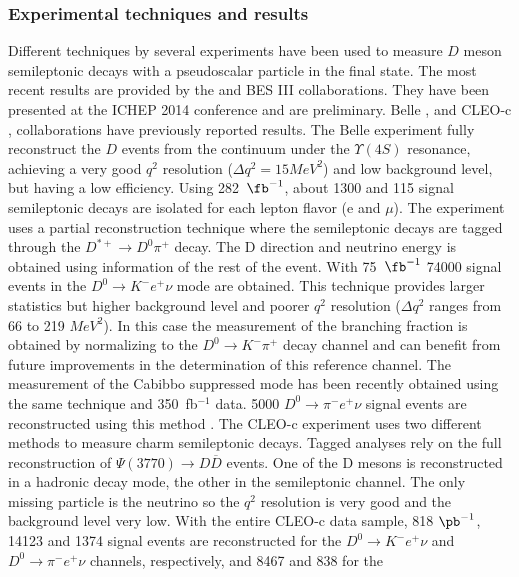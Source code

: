 \subsubsection{Experimental techniques and results}
 Different techniques by several experiments have been used to measure $D$ meson semileptonic decays with a 
pseudoscalar particle in the final state. The most recent results are provided by the \babar and BES III collaborations.
They have been presented at the ICHEP 2014 conference and are preliminary.  
Belle \cite{Widhalm:2006wz}, \babar \cite{Aubert:2007wg} and CLEO-c \cite{Besson:2009uv},\cite{Dobbs:2007aa} 
collaborations have previously reported results. 
The Belle experiment fully reconstruct the $D$ events from the continuum under the $\Upsilon(4S)$ resonance, 
achieving a very good $q^2$ resolution ($\Delta q^2 = 15 MeV^2$) and low background level, 
but having a low efficiency. Using 282~$\fb^{-1}$, about 1300 and 115 signal semileptonic decays are 
isolated for each lepton flavor (e and $\mu$). 
The \babar experiment uses a partial reconstruction technique where the semileptonic decays are tagged 
through the $ D^{\ast +}\to D^0\pi^+$ decay. 
The D direction and neutrino energy is obtained using information of the rest of the event. 
With 75~$\fb^{-1}$ 74000 signal events in the $D^0 \to {K}^- e^+ \nu$ mode are obtained. 
This technique provides larger statistics but higher background level and poorer $q^2$ resolution ($\Delta q^2$ ranges from 66 to 219 $MeV^2$). In this case the measurement of the branching fraction is obtained by normalizing to the $D^0 \to K^- \pi^+$ decay channel and can benefit from future improvements in the determination of this reference channel. The measurement of the Cabibbo suppressed mode has been recently obtained 
using the same technique and 350~fb$^{-1}$ data. 5000 $D^0 \to {\pi}^- e^+ \nu$ signal events are reconstructed using this method \cite{babar-new}.  
The CLEO-c experiment uses two different methods to measure charm semileptonic decays. 
Tagged analyses \cite{Besson:2009uv} rely on the full reconstruction of $\Psi(3770)\to D {\overline D}$ events. One of the D mesons is reconstructed in a hadronic decay mode, the other in the semileptonic channel. The only missing particle is the neutrino so the $q^2$ resolution is very good and the background level very low.   
With the entire CLEO-c data sample, 818 $\pb^{-1}$, 14123 and 1374 signal events are reconstructed for 
the $D^0 \to K^{-} e^+\nu$ and $D^0\to \pi^{-} e^+\nu$ channels, respectively, and 8467 and 838 for the 

